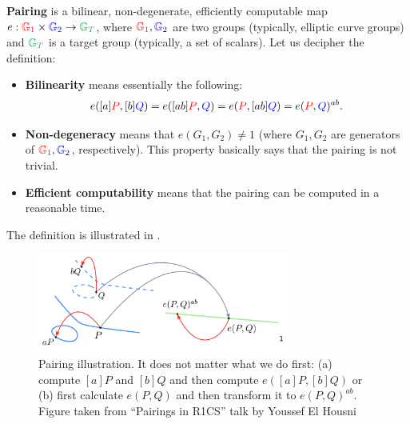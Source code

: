 \documentclass[../lecture-notes.tex]{subfiles}
\begin{document}
\begin{definition}
    \textbf{Pairing} is a bilinear, non-degenerate, efficiently computable map $e: \textcolor{red}{\mathbb{G}_1} \times \textcolor{blue}{\mathbb{G}_2} \to \textcolor{ForestGreen}{\mathbb{G}_T}$, where $\textcolor{red}{\mathbb{G}_1},\textcolor{blue}{\mathbb{G}_2}$ are two groups (typically, elliptic curve groups) and $\textcolor{ForestGreen}{\mathbb{G}_T}$ is a target group (typically, a set of scalars). Let us decipher the definition:
    \begin{itemize}
        \item \textbf{Bilinearity} means essentially the following:
        \begin{equation*}
            e([a]\textcolor{red}{P},[b]\textcolor{blue}{Q}) = e([ab]\textcolor{red}{P},\textcolor{blue}{Q}) = e(\textcolor{red}{P},[ab]\textcolor{blue}{Q}) = e(\textcolor{red}{P},\textcolor{blue}{Q})^{ab}.        
        \end{equation*}
        \item \textbf{Non-degeneracy} means that $e(G_1,G_2) \neq 1$ (where $G_1,G_2$ are generators of $\textcolor{red}{\mathbb{G}_1},\textcolor{blue}{\mathbb{G}_2}$, respectively). This property basically says that the pairing is not trivial.
        \item \textbf{Efficient computability} means that the pairing can be computed in a reasonable time.
    \end{itemize}

    The definition is illustrated in .
\end{definition}

\begin{figure}[H]
    \centering
    \includegraphics[width=0.75\textwidth]{images/lecture_4/pairing.png}
    \caption{Pairing illustration. It does not matter what we do first: (a) compute $[a]P$ and $[b]Q$ and then compute $e([a]P,[b]Q)$ or (b) first calculate $e(P,Q)$ and then transform it to $e(P,Q)^{ab}$. \scriptsize{Figure taken from ``Pairings in R1CS'' talk by Youssef El Housni}}
    \label{fig:ecpairing}
\end{figure}
\end{document}
